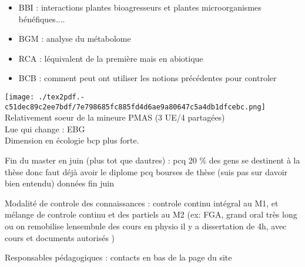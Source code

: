 \documentclass[
]{article}
\providecommand{\tightlist}{%
  \setlength{\itemsep}{0pt}\setlength{\parskip}{0pt}}
\begin{document}
\begin{itemize}
\tightlist
\item
  BBI : interactions plantes bioagresseurs et plantes microorganismes
  bénéfiques....
\item
  BGM : analyse du métabolome
\item
  RCA : l\textquotesingle équivalent de la première mais en abiotique
\item
  BCB : comment peut ont utiliser les notions précédentes pour controler
\end{itemize}

\texttt{[image: ./tex2pdf.-c51dec89c2ee7bdf/7e798685fc885fd4d6ae9a80647c5a4db1dfcebc.png]}\\
Relativement soeur de la mineure PMAS (3 UE/4 partagées)\\
L\textquotesingle ue qui change : EBG\\
Dimension en écologie bcp plus forte.

Fin du master en juin (plus tot que d\textquotesingle autres) : pcq 20
\% des gens se destinent à la thèse donc faut déjà avoir le diplome pcq
bourses de thèse (suis pas sur d\textquotesingle avoir bien entendu)
données fin juin

Modalité de controle des connaissances : controle continu intégral au
M1, et mélange de controle continu et des partiels au M2 (ex: FGA, grand
oral très long ou on remobilise l\textquotesingle ensembnle des cours
\textbar{} en physio il y a dissertation de 4h, avec cours et documents
autorisés )

Responsables pédagogiques : contacts en bas de la page du site
\end{document}
